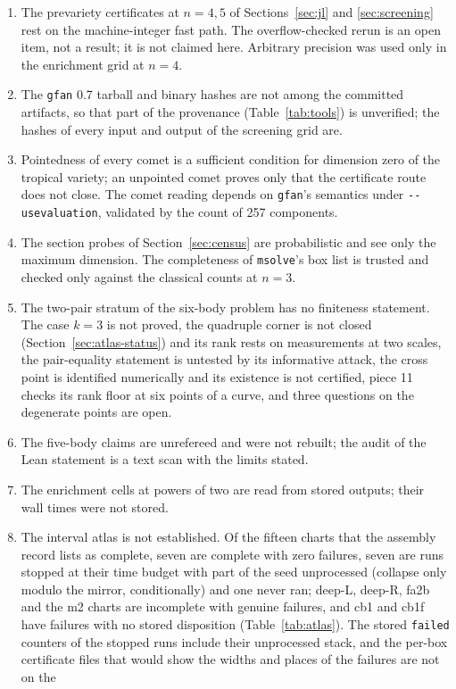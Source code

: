 \documentclass[11pt]{article}
\theoremstyle{definition}
\theoremstyle{remark}
\begin{document}
\begin{enumerate}
\item The prevariety certificates at $n=4,5$ of Sections~\ref{sec:jl} and \ref{sec:screening} rest on the machine-integer
fast path. The overflow-checked rerun is an open item, not a result; it is not claimed here. Arbitrary precision was used only
in the enrichment grid at $n=4$.
\item The \texttt{gfan} 0.7 tarball and binary hashes are not among the committed artifacts, so that part of the provenance
(Table~\ref{tab:tools}) is unverified; the hashes of every input and output of the screening grid are.
\item Pointedness of every comet is a sufficient condition for dimension zero of the tropical variety; an unpointed comet proves
only that the certificate route does not close. The comet reading depends on \texttt{gfan}'s semantics under
\texttt{-{}-usevaluation}, validated by the count of 257 components.
\item The section probes of Section~\ref{sec:census} are probabilistic and see only the maximum dimension. The completeness of
\texttt{msolve}'s box list is trusted and checked only against the classical counts at $n=3$.
\item The two-pair stratum of the six-body problem has no finiteness statement. The case $k=3$ is not proved, the
quadruple corner is not closed (Section~\ref{sec:atlas-status}) and its rank rests on measurements at two scales, the pair-equality statement is untested by its informative attack, the cross point is identified numerically and
its existence is not certified, piece 11 checks its rank floor at six points of a curve, and three questions on the degenerate points are open.
\item The five-body claims are unrefereed and were not rebuilt; the audit of the Lean statement is a text scan with the limits stated.
\item The enrichment cells at powers of two are read from stored outputs; their wall times were not stored.
\item The interval atlas is not established. Of the fifteen charts that the assembly record lists as complete, seven are complete with zero failures, seven are runs stopped at their time budget with part of the seed
unprocessed (collapse only modulo the mirror, conditionally) and one never ran; deep-L, deep-R, fa2b and the m2 charts are incomplete with genuine failures, and cb1 and cb1f have failures with no stored disposition
(Table~\ref{tab:atlas}). The stored \texttt{failed} counters of the stopped runs include their unprocessed stack, and the per-box certificate files that would show the widths and places of the failures are not on the

\end{enumerate}
\end{document}
